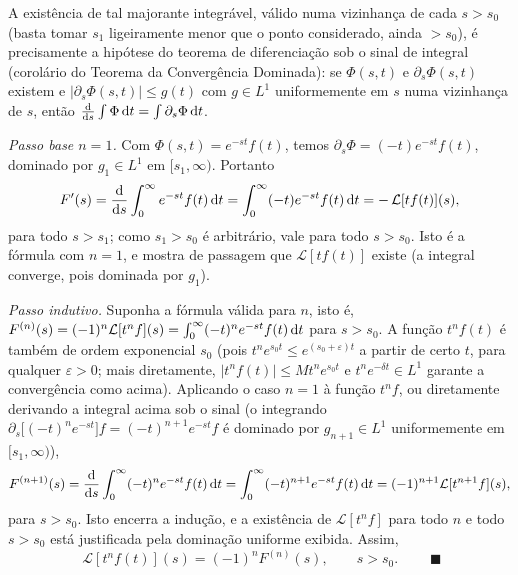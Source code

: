 A existência de tal majorante integrável, válido numa vizinhança de cada $s>s_0$ (basta tomar $s_1$ ligeiramente menor que o ponto considerado, ainda $>s_0$), é precisamente a hipótese do teorema de diferenciação sob o sinal de integral (corolário do Teorema da Convergência Dominada): se $\Phi(s,t)$ e $\partial_s\Phi(s,t)$ existem e $|\partial_s\Phi(s,t)|\le g(t)$ com $g\in L^1$ uniformemente em $s$ numa vizinhança de $s$, então $\frac{\mathrm{d}}{\mathrm{d} s}\int\Phi\,\mathrm{d} t=\int\partial_s\Phi\,\mathrm{d} t$.

\emph{Passo base $n=1$.} Com $\Phi(s,t)=e^{-st}f(t)$, temos $\partial_s\Phi=(-t)e^{-st}f(t)$, dominado por $g_1\in L^1$ em $[s_1,\infty)$. Portanto
\[
F'(s)=\frac{\mathrm{d}}{\mathrm{d} s}\int_0^\infty e^{-st}f(t)\,\mathrm{d} t
=\int_0^\infty (-t)e^{-st}f(t)\,\mathrm{d} t=-\,\mathcal{L}[t f(t)](s),
\]
para todo $s>s_1$; como $s_1>s_0$ é arbitrário, vale para todo $s>s_0$. Isto é a fórmula com $n=1$, e mostra de passagem que $\mathcal{L}[t f(t)]$ existe (a integral converge, pois dominada por $g_1$).

\emph{Passo indutivo.} Suponha a fórmula válida para $n$, isto é, $F^{(n)}(s)=(-1)^n\mathcal{L}[t^n f](s)=\int_0^\infty(-t)^n e^{-st}f(t)\,\mathrm{d} t$ para $s>s_0$. A função $t^n f(t)$ é também de ordem exponencial $s_0$ (pois $t^n e^{s_0 t}\le e^{(s_0+\varepsilon)t}$ a partir de certo $t$, para qualquer $\varepsilon>0$; mais diretamente, $|t^n f(t)|\le M t^n e^{s_0 t}$ e $t^n e^{-\delta t}\in L^1$ garante a convergência como acima). Aplicando o caso $n=1$ à função $t^n f$, ou diretamente derivando a integral acima sob o sinal (o integrando $\partial_s\big[(-t)^n e^{-st}\big]f=(-t)^{n+1}e^{-st}f$ é dominado por $g_{n+1}\in L^1$ uniformemente em $[s_1,\infty)$),
\[
F^{(n+1)}(s)=\frac{\mathrm{d}}{\mathrm{d} s}\int_0^\infty(-t)^n e^{-st}f(t)\,\mathrm{d} t
=\int_0^\infty(-t)^{n+1}e^{-st}f(t)\,\mathrm{d} t=(-1)^{n+1}\mathcal{L}[t^{n+1}f](s),
\]
para $s>s_0$. Isto encerra a indução, e a existência de $\mathcal{L}[t^n f]$ para todo $n$ e todo $s>s_0$ está justificada pela dominação uniforme exibida. Assim,
\[
\boxed{\;\mathcal{L}[t^n f(t)](s)=(-1)^n F^{(n)}(s),\qquad s>s_0.\;}
\qquad\blacksquare
\]


